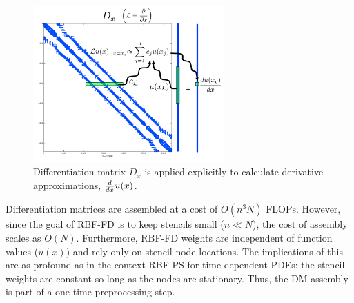 \documentclass[11pt]{report}
\begin{document}
{\begin{figure}[htbp]
	\centering
		\includegraphics[width=0.65\textwidth]{omnigraffle/DM_rows.pdf}
		\caption{Differentiation matrix $D_x$ is applied explicitly to calculate derivative approximations, $\frac{d }{d x} u(x)$. }
		\label{fig:example_DM_rows}
\end{figure}

Differentiation matrices are assembled at a cost of $O(n^3 N)$ FLOPs. However, since the goal of RBF-FD is to keep stencils small ($n \ll N$), the cost of assembly scales as $O(N)$. Furthermore, RBF-FD weights are independent of function values ($u(x)$) and rely only on stencil node locations. The implications of this are as profound as in the context RBF-PS for time-dependent PDEs: the stencil weights are constant so long as the nodes are stationary. Thus, the DM assembly is part of a one-time preprocessing step.%

}
\end{document}
